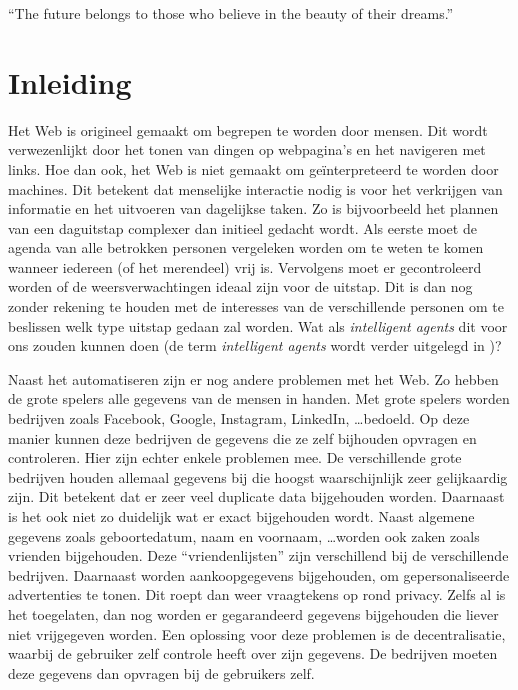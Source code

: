 \begin{savequote}[0.55\linewidth]
	``The future belongs to those who believe in the beauty of their dreams.''
\end{savequote}

\chapter{Inleiding}
Het Web is origineel gemaakt om begrepen te worden door mensen. Dit wordt verwezenlijkt door het tonen van dingen op webpagina's en het navigeren met links. Hoe dan ook, het Web is niet gemaakt om geïnterpreteerd te worden door machines. Dit betekent dat menselijke interactie nodig is voor het verkrijgen van informatie en het uitvoeren van dagelijkse taken. Zo is bijvoorbeeld het plannen van een daguitstap complexer dan initieel gedacht wordt. Als eerste moet de agenda van alle betrokken personen vergeleken worden om te weten te komen wanneer iedereen (of het merendeel) vrij is. Vervolgens moet er gecontroleerd worden of de weersverwachtingen ideaal zijn voor de uitstap. Dit is dan nog zonder rekening te houden met de interesses van de verschillende personen om te beslissen welk type uitstap gedaan zal worden. Wat als \textit{intelligent agents} dit voor ons zouden kunnen doen (de term \textit{intelligent agents} wordt verder uitgelegd in )?

Naast het automatiseren zijn er nog andere problemen met het Web. Zo hebben de grote spelers alle gegevens van de mensen in handen. Met grote spelers worden bedrijven zoals Facebook, Google, Instagram, LinkedIn, \dots bedoeld. Op deze manier kunnen deze bedrijven de gegevens die ze zelf bijhouden opvragen en controleren. Hier zijn echter enkele problemen mee. De verschillende grote bedrijven houden allemaal gegevens bij die hoogst waarschijnlijk zeer gelijkaardig zijn. Dit betekent dat er zeer veel duplicate data bijgehouden worden. Daarnaast is het ook niet zo duidelijk wat er exact bijgehouden wordt. Naast algemene gegevens zoals geboortedatum, naam en voornaam, \dots worden ook zaken zoals vrienden bijgehouden. Deze ``vriendenlijsten'' zijn verschillend bij de verschillende bedrijven. Daarnaast worden aankoopgegevens bijgehouden, om gepersonaliseerde advertenties te tonen. Dit roept dan weer vraagtekens op rond privacy. Zelfs al is het toegelaten, dan nog worden er gegarandeerd gegevens bijgehouden die liever niet vrijgegeven worden. Een oplossing voor deze problemen is de decentralisatie, waarbij de gebruiker zelf controle heeft over zijn gegevens. De bedrijven moeten deze gegevens dan opvragen bij de gebruikers zelf. 

